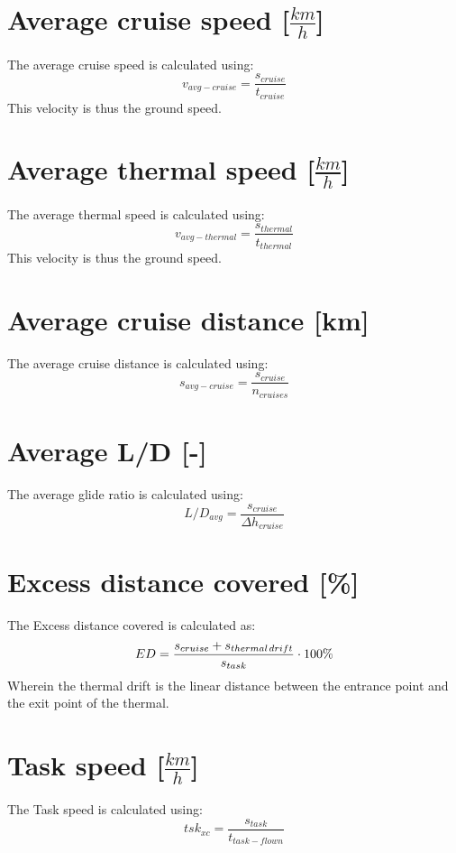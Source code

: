 \section{Average cruise speed [$\frac{km}{h}$]}
The average cruise speed is calculated using:
\begin{equation}
{v_{avg - cruise}} = \frac{{{s_{cruise}}}}{{{t_{cruise}}}}
\end{equation}
This velocity is thus the ground speed.

\section{Average thermal speed [$\frac{km}{h}$]}
The average thermal speed is calculated using:
\begin{equation}
{v_{avg - thermal}} = \frac{{{s_{thermal}}}}{{{t_{thermal}}}}
\end{equation}
This velocity is thus the ground speed.

\section{Average cruise distance [km]}
The average cruise distance is calculated using:
\begin{equation}
{s_{avg - cruise}} = \frac{{{s_{cruise}}}}{{{n_{cruises}}}}
\end{equation}

\section{Average L/D [-]}
The average glide ratio is calculated using:
\begin{equation}
L/{D_{avg}} = \frac{{{s_{cruise}}}}{{\Delta {h_{cruise}}}}
\end{equation}

\section{Excess distance covered [\%]}
The Excess distance covered is calculated as:
\begin{equation}
ED = \frac{{{s_{cruise}} + {s_{thermal{\kern 1pt} drift}}}}{{{s_{task}}}} \cdot 100\% 
\end{equation}
Wherein the thermal drift is the linear distance between the entrance point and the exit point of the thermal.

\section{Task speed [$\frac{km}{h}$]}
The Task speed is calculated using:
\begin{equation}
{tsk_{xc}} = \frac{{{s_{task}}}}{{{t_{task - flown}}}}
\end{equation}

